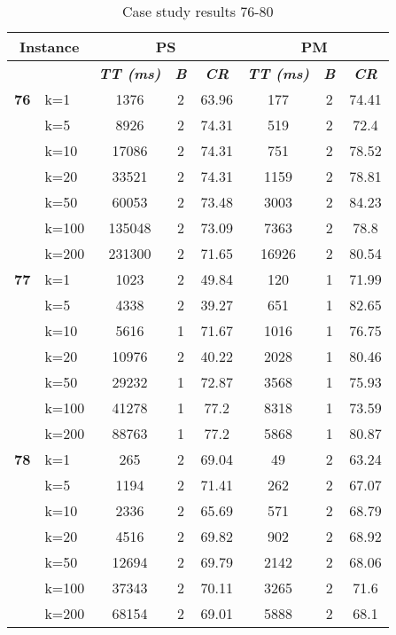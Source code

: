     \begin{table}[htbp]
    \caption{Case study results 76-80}
    \centering
    \begin{tabular}{|l|l|c|c|c|c|c|c|}
    \hline
    \multicolumn{ 2}{|c|}{\textbf{Instance}} & \multicolumn{ 3}{c|}{\textbf{PS}} & \multicolumn{ 3}{c|}{\textbf{PM}} \\ \hline
    \multicolumn{ 2}{|l|}{} & \textbf{\textit{TT (ms)}} & \textbf{\textit{B}} & \textbf{\textit{CR}} & \textbf{\textit{TT (ms)}} & \textbf{\textit{B}} & \textbf{\textit{CR}} \\ \hline
    \multicolumn{1}{|r|}{\textbf{76}} & k=1 & 1376 & 2 & 63.96 & 177 & 2 & 74.41 \\ 
     & k=5 & 8926 & 2 & 74.31 & 519 & 2 & 72.4 \\ 
     & k=10 & 17086 & 2 & 74.31 & 751 & 2 & 78.52 \\ 
     & k=20 & 33521 & 2 & 74.31 & 1159 & 2 & 78.81 \\ 
     & k=50 & 60053 & 2 & 73.48 & 3003 & 2 & 84.23 \\ 
     & k=100 & 135048 & 2 & 73.09 & 7363 & 2 & 78.8 \\ 
     & k=200 & 231300 & 2 & 71.65 & 16926 & 2 & 80.54 \\ \hline
    \multicolumn{1}{|r|}{\textbf{77}} & k=1 & 1023 & 2 & 49.84 & 120 & 1 & 71.99 \\ 
     & k=5 & 4338 & 2 & 39.27 & 651 & 1 & 82.65 \\ 
     & k=10 & 5616 & 1 & 71.67 & 1016 & 1 & 76.75 \\ 
     & k=20 & 10976 & 2 & 40.22 & 2028 & 1 & 80.46 \\ 
     & k=50 & 29232 & 1 & 72.87 & 3568 & 1 & 75.93 \\ 
     & k=100 & 41278 & 1 & 77.2 & 8318 & 1 & 73.59 \\ 
     & k=200 & 88763 & 1 & 77.2 & 5868 & 1 & 80.87 \\ \hline
    \multicolumn{1}{|r|}{\textbf{78}} & k=1 & 265 & 2 & 69.04 & 49 & 2 & 63.24 \\ 
     & k=5 & 1194 & 2 & 71.41 & 262 & 2 & 67.07 \\ 
     & k=10 & 2336 & 2 & 65.69 & 571 & 2 & 68.79 \\ 
     & k=20 & 4516 & 2 & 69.82 & 902 & 2 & 68.92 \\ 
     & k=50 & 12694 & 2 & 69.79 & 2142 & 2 & 68.06 \\ 
     & k=100 & 37343 & 2 & 70.11 & 3265 & 2 & 71.6 \\ 
     & k=200 & 68154 & 2 & 69.01 & 5888 & 2 & 68.1 \\ \hline

\end{tabular}
\end{table}
